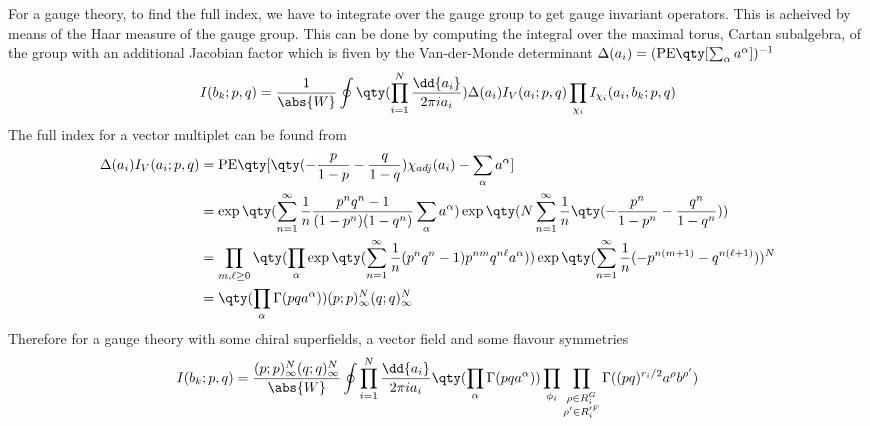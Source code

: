 For a gauge theory, to find the full index, we have to integrate over the gauge group to get gauge invariant operators. This is acheived by means of the Haar measure of the gauge group. This can be done by computing the integral over the maximal torus, Cartan subalgebra, of the group with an additional Jacobian factor which is fiven by the Van-der-Monde determinant $\Delta(a_{i})=(\text{PE}\qty[\sum_{\alpha}a^{\alpha}])^{-1}$
\begin{equation}
	I(b_{k};p,q)=\frac{1}{\abs{W}}\oint\qty(\prod_{i=1}^{N}\frac{\dd{a_{i}}}{2\pi i a_{i}})\Delta(a_{i})I_{V}(a_{i};p,q)\prod_{\chi_{i}}I_{\chi_{i}}(a_{i},b_{k};p,q)
\end{equation}
The full index for a vector multiplet can be found from 
\begin{equation}
\begin{split}
	\Delta(a_{i})I_{V}(a_{i};p,q)&=\text{PE}\qty[\qty(-\frac{p}{1-p}-\frac{q}{1-q})\chi_{adj}(a_{i})-\sum_{\alpha}a^{\alpha}]\\
	&=\exp\qty(\sum_{n=1}^{\infty}\frac{1}{n}\frac{p^{n}q^{n}-1}{(1-p^{n})(1-q^{n})}\sum_{\alpha}a^{\alpha})\exp\qty(N\sum_{n=1}^{\infty}\frac{1}{n}\qty(-\frac{p^{n}}{1-p^{n}}-\frac{q^{n}}{1-q^{n}}))\\
	&=\prod_{m,\ell\ge0}\qty(\prod_{\alpha}\exp\qty(\sum_{n=1}^{\infty}\frac{1}{n}(p^{n}q^{n}-1)p^{nm}q^{n\ell}a^{\alpha}))\exp\qty(\sum_{n=1}^{\infty}\frac{1}{n}(-p^{n(m+1)}-q^{n(\ell+1)}))^{N}\\
	&=\qty(\prod_{\alpha}\Gamma(pq a^{\alpha}))(p;p)_{\infty}^{N}(q;q)_{\infty}^{N}
\end{split}
\end{equation}
Therefore for a gauge theory with some chiral superfields, a vector field and some flavour symmetries
\begin{equation}
	I(b_{k};p,q)=\frac{(p;p)_{\infty}^{N}(q;q)_{\infty}^{N}}{\abs{W}}\oint\prod_{i=1}^{N}\frac{\dd{a_{i}}}{2\pi i a_{i}}\qty(\prod_{\alpha}\Gamma(pqa^{\alpha}))\prod_{\phi_{i}}\prod_{\substack{\rho\in R_{i}^{G}\\ \rho^{\prime}\in R^{\prime F}_{i}}}\Gamma((pq)^{r_{i}/2}a^{\rho}b^{\rho^{\prime}})
\end{equation}
